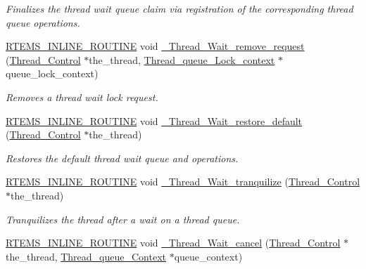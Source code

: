 \begin{DoxyCompactItemize}
\begin{DoxyCompactList}\small\item\em Finalizes the thread wait queue claim via registration of the corresponding thread queue operations. \end{DoxyCompactList}\item 
\mbox{\hyperlink{group__RTEMSScoreBaseDefs_gac216239df231d5dbd15e3520b0b9313f}{R\+T\+E\+M\+S\+\_\+\+I\+N\+L\+I\+N\+E\+\_\+\+R\+O\+U\+T\+I\+NE}} void \mbox{\hyperlink{group__RTEMSScoreThread_gad6f75b9158cddc463bad914c2f9f51a1}{\+\_\+\+Thread\+\_\+\+Wait\+\_\+remove\+\_\+request}} (\mbox{\hyperlink{struct__Thread__Control}{Thread\+\_\+\+Control}} $\ast$the\+\_\+thread, \mbox{\hyperlink{structThread__queue__Lock__context}{Thread\+\_\+queue\+\_\+\+Lock\+\_\+context}} $\ast$queue\+\_\+lock\+\_\+context)
\begin{DoxyCompactList}\small\item\em Removes a thread wait lock request. \end{DoxyCompactList}\item 
\mbox{\hyperlink{group__RTEMSScoreBaseDefs_gac216239df231d5dbd15e3520b0b9313f}{R\+T\+E\+M\+S\+\_\+\+I\+N\+L\+I\+N\+E\+\_\+\+R\+O\+U\+T\+I\+NE}} void \mbox{\hyperlink{group__RTEMSScoreThread_ga3cfaf5eea12b9810ca64404cec7e3763}{\+\_\+\+Thread\+\_\+\+Wait\+\_\+restore\+\_\+default}} (\mbox{\hyperlink{struct__Thread__Control}{Thread\+\_\+\+Control}} $\ast$the\+\_\+thread)
\begin{DoxyCompactList}\small\item\em Restores the default thread wait queue and operations. \end{DoxyCompactList}\item 
\mbox{\hyperlink{group__RTEMSScoreBaseDefs_gac216239df231d5dbd15e3520b0b9313f}{R\+T\+E\+M\+S\+\_\+\+I\+N\+L\+I\+N\+E\+\_\+\+R\+O\+U\+T\+I\+NE}} void \mbox{\hyperlink{group__RTEMSScoreThread_ga76f9b42638ae02922aa0a94a806f46a9}{\+\_\+\+Thread\+\_\+\+Wait\+\_\+tranquilize}} (\mbox{\hyperlink{struct__Thread__Control}{Thread\+\_\+\+Control}} $\ast$the\+\_\+thread)
\begin{DoxyCompactList}\small\item\em Tranquilizes the thread after a wait on a thread queue. \end{DoxyCompactList}\item 
\mbox{\hyperlink{group__RTEMSScoreBaseDefs_gac216239df231d5dbd15e3520b0b9313f}{R\+T\+E\+M\+S\+\_\+\+I\+N\+L\+I\+N\+E\+\_\+\+R\+O\+U\+T\+I\+NE}} void \mbox{\hyperlink{group__RTEMSScoreThread_gab82f6b31f52be120df0ff3b5641b52e2}{\+\_\+\+Thread\+\_\+\+Wait\+\_\+cancel}} (\mbox{\hyperlink{struct__Thread__Control}{Thread\+\_\+\+Control}} $\ast$the\+\_\+thread, \mbox{\hyperlink{structThread__queue__Context}{Thread\+\_\+queue\+\_\+\+Context}} $\ast$queue\+\_\+context)

\end{DoxyCompactItemize}
